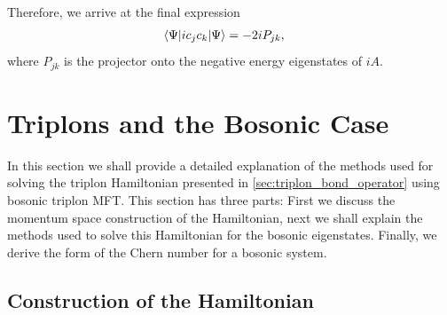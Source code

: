 Therefore, we arrive at the final expression
\begin{align}
        \braket{\Psi |i c_j  c_k | \Psi} 
        &= -2i P_{jk},
\end{align}
where $P_{jk}$ is the projector onto the negative energy eigenstates of $iA$. 


\section{Triplons and the Bosonic Case}\label{apx:triplon_mean_field_theory}

In this section we shall provide a detailed explanation of the methods used for solving the triplon Hamiltonian presented in \textsection\ref{sec:triplon_bond_operator} using bosonic triplon MFT. This section has three parts: First we discuss the momentum space construction of the Hamiltonian, next we shall explain the methods used to solve this Hamiltonian for the bosonic eigenstates. Finally, we derive the form of the Chern number for a bosonic system. 

\subsection{Construction of the Hamiltonian}

